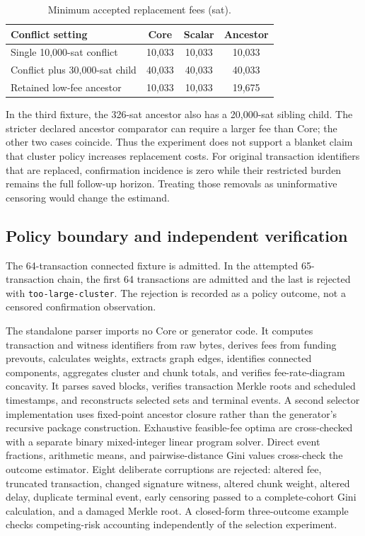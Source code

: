 \documentclass[conference]{IEEEtran}
\begin{document}
\begin{table}[t]
\caption{Minimum accepted replacement fees (sat).}
\label{tab:rbf}
\pubtable\footnotesize
\begin{tabularx}{\linewidth}{@{}Y *{3}{S[table-format=5.0]}@{}}\toprule
Conflict setting & {Core} & {Scalar} & {Ancestor}\\\midrule
Single 10,000-sat conflict & 10,033 & 10,033 & 10,033\\
\addlinespace[2pt]
Conflict plus 30,000-sat child & 40,033 & 40,033 & 40,033\\
\addlinespace[2pt]
Retained low-fee ancestor & 10,033 & 10,033 & 19,675\\\bottomrule
\end{tabularx}
\end{table}
In the third fixture, the 326-sat ancestor also has a 20,000-sat sibling child. The stricter declared ancestor comparator can require a larger fee than Core; the other two cases coincide. Thus the experiment does not support a blanket claim that cluster policy increases replacement costs. For original transaction identifiers that are replaced, confirmation incidence is zero while their restricted burden remains the full follow-up horizon. Treating those removals as uninformative censoring would change the estimand.

\subsection{Policy boundary and independent verification}
The 64-transaction connected fixture is admitted. In the attempted 65-transaction chain, the first 64 transactions are admitted and the last is rejected with \texttt{too-large-cluster}. The rejection is recorded as a policy outcome, not a censored confirmation observation.

The standalone parser imports no Core or generator code. It computes transaction and witness identifiers from raw bytes, derives fees from funding prevouts, calculates weights, extracts graph edges, identifies connected components, aggregates cluster and chunk totals, and verifies fee-rate-diagram concavity. It parses saved blocks, verifies transaction Merkle roots and scheduled timestamps, and reconstructs selected sets and terminal events. A second selector implementation uses fixed-point ancestor closure rather than the generator's recursive package construction. Exhaustive feasible-fee optima are cross-checked with a separate binary mixed-integer linear program solver. Direct event fractions, arithmetic means, and pairwise-distance Gini values cross-check the outcome estimator. Eight deliberate corruptions are rejected: altered fee, truncated transaction, changed signature witness, altered chunk weight, altered delay, duplicate terminal event, early censoring passed to a complete-cohort Gini calculation, and a damaged Merkle root. A closed-form three-outcome example checks competing-risk accounting independently of the selection experiment.
\end{document}
